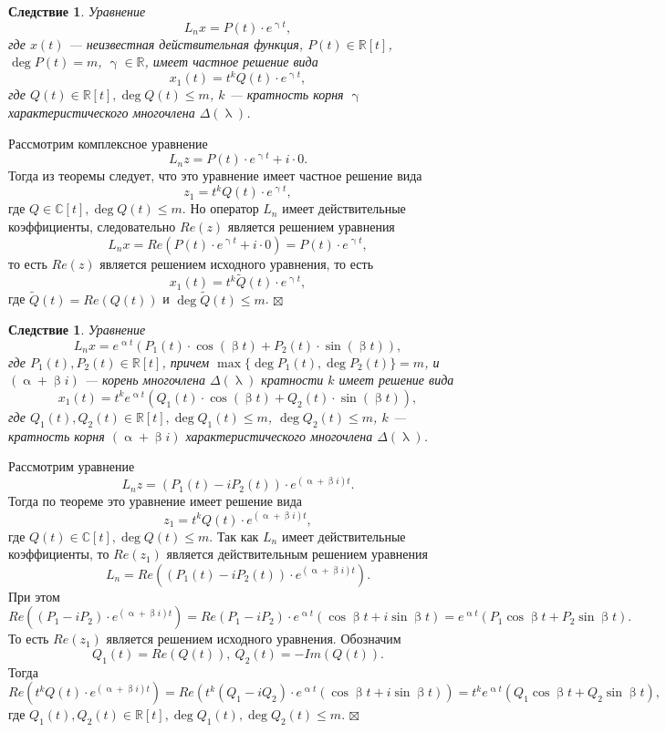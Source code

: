 \documentclass[a4paper, 12pt]{report}
\newenvironment{Proof} %
{\par\noindent{$\blacklozenge$}} %
{\hfill$\scriptstyle\boxtimes$}
\newcommand{\Rm}{\mathbb{R}}
\newcommand{\Cm}{\mathbb{C}}
\renewcommand{\alpha}{\upalpha}
\renewcommand{\beta}{\upbeta}
\renewcommand{\lambda}{\uplambda}
\begin{document}
\newtheorem*{2_5_2}{Следствие}\begin{2_5_2}
	Уравнение $$L_nx = P(t)\cdot e^{\upgamma t},$$ где $x(t)$ --- неизвестная действительная функция, $P(t)\in\Rm[t]$, $\deg P(t) = m$, $\upgamma \in \Rm$, имеет частное решение вида $$x_1(t) = t^kQ(t)\cdot e^{\upgamma t},$$ где $Q(t) \in \Rm[t], \deg Q(t) \leqslant m$, $k$ --- кратность корня $\upgamma$ характеристического многочлена $\Delta(\lambda)$.
\end{2_5_2}\begin{Proof}
Рассмотрим комплексное уравнение $$L_nz = P(t) \cdot e^{\upgamma t} + i\cdot 0.$$ Тогда из теоремы следует, что это уравнение имеет частное решение вида $$z_1 = t^kQ(t)\cdot e^{\upgamma t},$$ где $Q\in \Cm[t], \deg Q(t)\leqslant m$. Но оператор $L_n$ имеет действительные коэффициенты, следовательно $Re(z)$ является решением уравнения $$L_nx = Re(P(t)\cdot e^{\upgamma t} + i\cdot 0) = P(t)\cdot e^{\upgamma t},$$ то есть $Re(z)$ является решением исходного уравнения, то есть $$x_1(t) = t^k\widetilde{Q}(t)\cdot e^{\upgamma t},$$ где $\widetilde{Q}(t) = Re(Q(t))$ и $\deg \widetilde{Q}(t)\leqslant m$.
\end{Proof}
\newtheorem*{2_5_3}{Следствие}\begin{2_5_3}
	Уравнение $$L_nx = e^{\alpha t}(P_1(t)\cdot \cos(\beta t) + P_2(t)\cdot \sin (\beta t)),$$ где $P_1(t),P_2(t)\in \Rm[t]$, причем $\max\{\deg P_1(t),\deg P_2(t)\} = m$, и $(\alpha + \beta i)$ --- корень многочлена $\Delta (\lambda)$ кратности $k$ имеет решение вида $$x_1(t) = t^ke^{\alpha t}(Q_1(t)\cdot \cos(\beta t) + Q_2(t)\cdot \sin(\beta t)),$$ где $Q_1(t), Q_2(t) \in \Rm[t], \deg Q_1(t) \leqslant m$, $\deg Q_2(t) \leqslant m$, $k$ --- кратность корня $(\alpha + \beta i)$ характеристического многочлена $\Delta(\lambda)$.
\end{2_5_3}\begin{Proof}
Рассмотрим уравнение $$L_nz = (P_1(t) - i P_2(t))\cdot e^{(\alpha + \beta i)t}.$$ Тогда по теореме это уравнение имеет решение вида $$z_1= t^kQ(t)\cdot e^{(\alpha + \beta i)t},$$ где $Q(t)\in \Cm[t], \deg Q(t)\leqslant m$. Так как $L_n$ имеет действительные коэффициенты, то $Re(z_1)$ является действительным решением уравнения $$L_n = Re((P_1(t) - i P_2(t))\cdot e^{(\alpha + \beta i)t}).$$ При этом $$Re((P_1 - i P_2)\cdot e^{(\alpha + \beta i)t}) = Re(P_1 - iP_2)\cdot e^{\alpha t}(\cos \beta t + i \sin \beta t) = e^{\alpha t}(P_1 \cos \beta t  + P_2 \sin \beta t).$$ То есть $Re(z_1)$ является решением исходного уравнения. Обозначим $$Q_1(t) = Re(Q(t)),\ Q_2(t) = -Im(Q(t)).$$ Тогда $$Re(t^kQ(t)\cdot e^{(\alpha + \beta i)t}) = Re(t^k(Q_1 - i Q_2)\cdot e^{\alpha t}(\cos \beta t + i \sin \beta t)) = t^ke^{\alpha t}(Q_1\cos \beta t + Q_2 \sin \beta t),$$ где $Q_1(t), Q_2(t) \in \Rm[t], \deg Q_1(t), \deg Q_2(t) \leqslant m$. 
\end{Proof}
\end{document}

